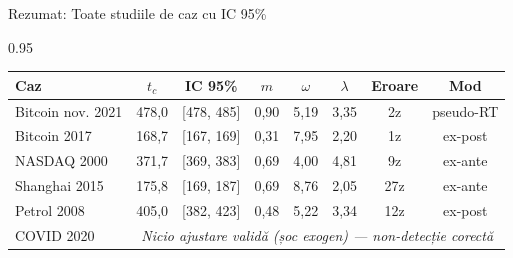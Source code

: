 \documentclass[9pt, aspectratio=169, t]{beamer}
\begin{document}
\begin{frame}{Rezumat: Toate studiile de caz cu IC 95\%}
    \begin{cminipage}{0.95\textwidth}
    {\scriptsize
    \begin{center}
        \begin{tabular}{lccccccc}
            \toprule
            \textbf{Caz} & \textbf{$t_c$} & \textbf{IC 95\%} & \textbf{$m$} & \textbf{$\omega$} & \textbf{$\lambda$} & \textbf{Eroare} & \textbf{Mod} \\
            \midrule
            Bitcoin nov. 2021 & 478,0 & [478, 485] & 0,90 & 5,19 & 3,35 & 2z & pseudo-RT \\
            Bitcoin 2017 & 168,7 & [167, 169] & 0,31 & 7,95 & 2,20 & 1z & ex-post \\
            NASDAQ 2000 & 371,7 & [369, 383] & 0,69 & 4,00 & 4,81 & 9z & ex-ante \\
            Shanghai 2015 & 175,8 & [169, 187] & 0,69 & 8,76 & 2,05 & 27z & ex-ante \\
            Petrol 2008 & 405,0 & [382, 423] & 0,48 & 5,22 & 3,34 & 12z & ex-post \\
            \midrule
            COVID 2020 & \multicolumn{7}{c}{\textit{Nicio ajustare validă (șoc exogen) --- non-detecție corectă}} \\
            \bottomrule
        \end{tabular}
    \end{center}

}
\end{cminipage}
\end{frame}
\end{document}
